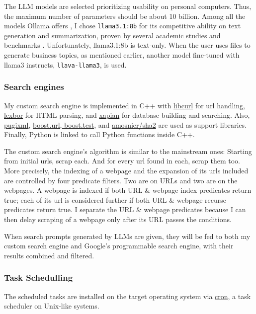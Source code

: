 \documentclass[final-report]{report-template}
\begin{document}
The LLM models are selected prioritizing usability on personal computers. Thus,
the maximum number of parameters should be about 10 billion. Among all the
models Ollama offers \cite{ollama.models}, I chose \texttt{llama3.1:8b} for its
competitive ability on text generation and summarization, proven by several
academic studies and benchmarks
\cite{llama3.1.bench.1, llama3.1.bench.2, llama3.1.bench.3}. Unfortunately,
llama3.1:8b is text-only. When the user uses files to generate business topics,
as mentioned earlier, another model fine-tuned with llama3 instructs,
\texttt{llava-llama3}, is used.

\subsubsection{Search engines}
My custom search engine is implemented in C++ with
\href{https://curl.se/libcurl/}{\ttfamily libcurl} for url handling,
\href{https://lexbor.com/}{\ttfamily lexbor} for HTML parsing, and
\href{https://xapian.org/docs/}{\ttfamily xapian} for database building and
searching. Also, \href{https://pugixml.org/}{\ttfamily pugixml},
\href{https://www.boost.org/}{\ttfamily boost.url, boost.test}, and
\href{https://github.com/amosnier/sha-2}{\ttfamily amosnier/sha2} are used as
support libraries. Finally, Python is linked to call Python functions inside
C++.

The custom search engine's algorithm is similar to the mainstream ones:
Starting from initial urls, scrap each. And for every url found in each, scrap
them too.  More precisely, the indexing of a webpage and the expansion of its
urls included are controlled by four predicate filters. Two are on URLs and two
are on the webpages. A webpage is indexed if both URL \& webpage index
predicates return true; each of its url is considered further if both URL \&
webpage recurse predicates return true. I separate the URL \& webpage
predicates because I can then delay scraping of a webpage only after its URL
passes the conditions.

When search prompts generated by LLMs are given, they will be fed to both my
custom search engine and Google's programmable search engine, with their
results combined and filtered.

\subsubsection{Task Schedulling}
The scheduled tasks are installed on the target operating system via
\href{https://en.wikipedia.org/wiki/Cron}{cron}, a task scheduler on Unix-like
systems.
\end{document}
